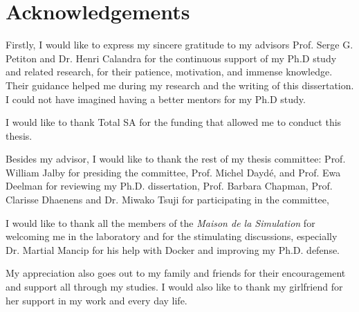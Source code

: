 \chapter*{Acknowledgements}

Firstly, I would like to express my sincere gratitude to my advisors Prof. Serge G. Petiton and Dr. Henri Calandra for the continuous support of my Ph.D study and related research, for their patience, motivation, and immense knowledge.
Their guidance helped me during my research and the writing of this dissertation.
I could not have imagined having a better mentors for my Ph.D study.

I would like to thank Total SA for the funding that allowed me to conduct this thesis.

Besides my advisor, I would like to thank the rest of my thesis committee: Prof. William Jalby for presiding the committee, Prof. Michel Daydé, and Prof. Ewa Deelman for reviewing my Ph.D. dissertation, Prof. Barbara Chapman, Prof. Clarisse Dhaenens and Dr. Miwako Tsuji for participating in the committee,

I would like to thank all the members of the \textit{Maison de la Simulation} for welcoming me in the laboratory and for the stimulating discussions, especially Dr. Martial Mancip for his help with Docker and improving my Ph.D. defense.

My appreciation also goes out to my family and friends for their encouragement and support all through my studies.
I would also like to thank my girlfriend for her support in my work and every day life.